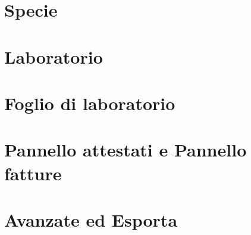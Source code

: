 \section*{Specie}

\section*{Laboratorio}

\section*{Foglio di laboratorio}

\section*{Pannello attestati e Pannello fatture}

\section*{Avanzate ed Esporta}